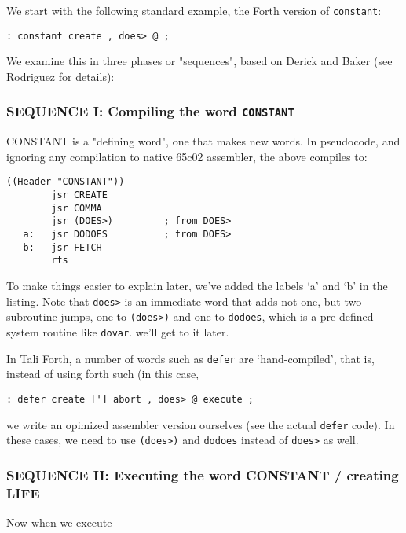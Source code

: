 We start with the following standard example, the Forth version of
\texttt{constant}: 

\begin{lstlisting}[frame=lines]
        : constant create , does> @ ; 
\end{lstlisting}

\noindent We examine this in three phases or "sequences", based on Derick and Baker (see
Rodriguez for details):   


\subsubsection{SEQUENCE I: Compiling the word \texttt{CONSTANT}}

CONSTANT is a "defining word", one that makes new words. In pseudocode, and
ignoring any compilation to native 65c02 assembler, the above compiles to: 
\begin{lstlisting}[frame=lines]
        ((Header "CONSTANT")) 
        jsr CREATE
        jsr COMMA
        jsr (DOES>)         ; from DOES>
   a:   jsr DODOES          ; from DOES>
   b:   jsr FETCH
        rts
\end{lstlisting}

\noindent To make things easier to explain later, we've added the labels `a' and `b' in
the listing. Note that \texttt{does>} is an immediate word that adds not one, but two
subroutine jumps, one to \texttt{(does>)} and one to \texttt{dodoes}, which is a pre-defined
system routine like \texttt{dovar}. we'll get to it later.

In Tali Forth, a number of words such as \texttt{defer} are
`hand-compiled', that is, instead of using forth such (in this case, 

\begin{lstlisting}[frame=lines]
        : defer create ['] abort , does> @ execute ; 
\end{lstlisting}

\noindent we write an opimized assembler version ourselves (see the actual \texttt{defer}
code). In these cases, we need to use \texttt{(does>)} and \texttt{dodoes}
instead of \texttt{does>} as well.


\subsubsection{SEQUENCE II: Executing the word CONSTANT / creating LIFE }

Now when we execute

